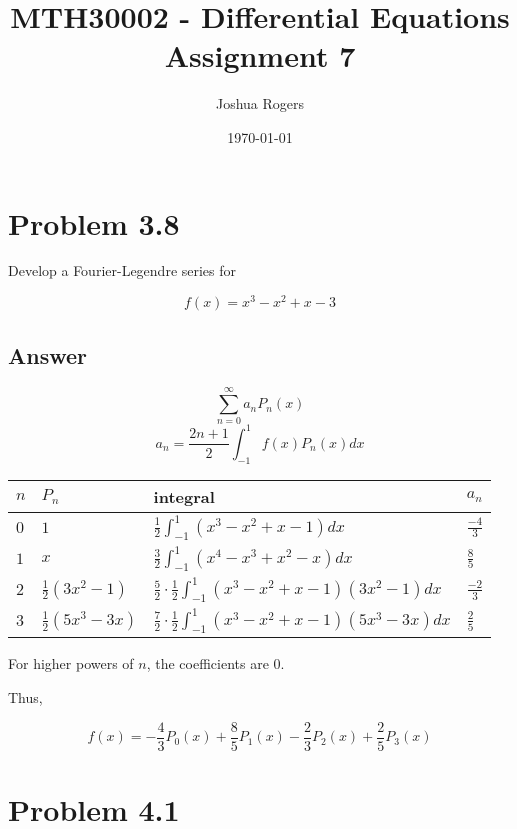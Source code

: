 \documentclass{article}
\title{\vspace{-4cm}MTH30002 - Differential Equations \\Assignment 7}
\author{Joshua Rogers}
\date\today
\begin{document}
\maketitle

\section*{Problem 3.8}

Develop a Fourier-Legendre series for

\begin{equation}\label{38A}
f(x) = x^3-x^2+x-3
\end{equation}


\subsection*{Answer}
$$ \sum_{n=0}^{\infty} a_n P_n (x) $$
$$ a_n = \frac{2n+1}{2} \int_{-1}^{1} f(x) P_n(x) dx $$

\begin{tabular}{
  |p{}
  |p{}
  |p{}
  |p{}|
  }
  \hline
  \centering $n$     & \centering $P_n$     & \centering integral & \centering\arraybackslash $a_n$     \\ \hline
  $0$ & $1$ & $\frac{1}{2} \int_{-1}^{1} \left(x^3-x^2+x-1\right) dx$ & $\frac{-4}{3}$ \\ \hline
  $1$ & $x$ & $\frac{3}{2} \int_{-1}^{1} \left(x^4-x^3+x^2-x\right) dx$ & $\frac{8}{5}$ \\ \hline
  $2$ & $\frac{1}{2} \left(3x^2-1\right)$ & $\frac{5}{2} \cdot \frac{1}{2} \int_{-1}^{1} \left(x^3-x^2+x-1\right)\left(3x^2-1\right) dx$ & $\frac{-2}{3}$ \\ \hline
  $3$ & $\frac{1}{2} \left(5x^3-3x\right)$ & $\frac{7}{2} \cdot \frac{1}{2} \int_{-1}^{1} \left(x^3-x^2+x-1\right)\left(5x^3-3x\right) dx$ & $\frac{2}{5}$ \\ \hline
\end{tabular}


For higher powers of $n$, the coefficients are 0.

Thus,

$$
f(x) = -\frac{4}{3} P_0(x) + \frac{8}{5} P_1(x) - \frac{2}{3} P_2(x) + \frac{2}{5} P_3(x)
$$



\section*{Problem 4.1}
\end{document}
